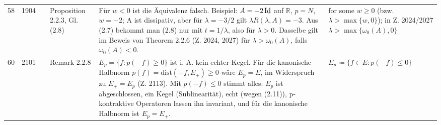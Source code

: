 \documentclass[10pt]{article}
\begin{document}
\begin{longtable}{@{}rrc>{\RaggedRight\arraybackslash}p{3.0cm}>{\RaggedRight\arraybackslash}p{11.4cm}>{\RaggedRight\arraybackslash}p{7.4cm}@{}}
58 & 1904 & \sichA{} & Proposition 2.2.3, Gl. (2.8) & Für $w < 0$ ist die Äquivalenz falsch. Beispiel: $A = -2\operatorname{Id}$ auf $\ensuremath{\mathbb{R}}$, $p = N$, $w = -2$; A ist dissipativ, aber für $\lambda = -3/2$ gilt $\lambda R(\lambda,A) = -3$. Aus (2.7) bekommt man (2.8) nur mit $t = 1/\lambda$, also für $\lambda > 0$. Dasselbe gilt im Beweis von Theorem 2.2.6 (Z. 2024, 2027) für $\lambda > \omega_{0}(A)$, falls $\omega_{0}(A) < 0$. & {for some $w \geq 0$} (bzw. $\lambda > \max\{w,0\}$); in Z. 2024/2027 $\lambda > \max\{\omega_{0}(A),0\}$ \\[2pt]
60 & 2101 & \sichA{} & Remark 2.2.8 & $E_{p} = \{f \colon p(-f) \geq 0\}$ ist i. A. kein echter Kegel. Für die kanonische Halbnorm $p(f) = \mathrm{dist}(-f,E_{+}) \geq 0$ wäre $E_{p} = E$, im Widerspruch zu $E_{+} = E_{p}$ (Z. 2113). Mit $p(-f) \leq 0$ stimmt alles: $E_p$ ist abgeschlossen, ein Kegel (Sublinearität), echt (wegen (2.11)), p-kontraktive Operatoren lassen ihn invariant, und für die kanonische Halbnorm ist $E_{p} = E_{+}$. & $E_{p} \coloneq \{f \in E \colon p(-f) \leq 0\}$ \\
\end{longtable}
\end{document}
